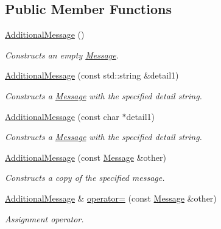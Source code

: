 \subsection*{Public Member Functions}
\begin{DoxyCompactItemize}
\item 
\hyperlink{class_additional_message_a888715179848c5e5c385789b962a3cfb}{Additional\+Message} ()\hypertarget{class_additional_message_a888715179848c5e5c385789b962a3cfb}{}\label{class_additional_message_a888715179848c5e5c385789b962a3cfb}

\begin{DoxyCompactList}\small\item\em Constructs an empty \hyperlink{class_message}{Message}. \end{DoxyCompactList}\item 
\hyperlink{class_additional_message_a990455bbfe260bc04f99e5acc58d1c06}{Additional\+Message} (const std\+::string \&detail1)
\begin{DoxyCompactList}\small\item\em Constructs a \hyperlink{class_message}{Message} with the specified detail string. \end{DoxyCompactList}\item 
\hyperlink{class_additional_message_a6486540f9b5d1957230e9e1f969adc9d}{Additional\+Message} (const char $\ast$detail1)
\begin{DoxyCompactList}\small\item\em Constructs a \hyperlink{class_message}{Message} with the specified detail string. \end{DoxyCompactList}\item 
\hyperlink{class_additional_message_a75735b6fd65686f31349d01c97c73bc7}{Additional\+Message} (const \hyperlink{class_message}{Message} \&other)
\begin{DoxyCompactList}\small\item\em Constructs a copy of the specified message. \end{DoxyCompactList}\item 
\hyperlink{class_additional_message}{Additional\+Message} \& \hyperlink{class_additional_message_abbda0de4323f70ff01a9b622a6f550f7}{operator=} (const \hyperlink{class_message}{Message} \&other)
\begin{DoxyCompactList}\small\item\em Assignment operator. \end{DoxyCompactList}\end{DoxyCompactItemize}


